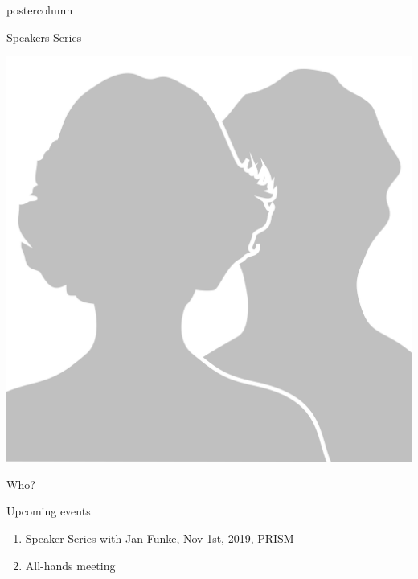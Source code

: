 \documentclass{beamer}
\begin{document}
\begin{frame}
\begin{columns}
\begin{column}{.33\textwidth}
\begin{beamercolorbox}[center,wd=\textwidth]{postercolumn}
\begin{minipage}[T]{.95\textwidth}
{\begin{myblock}{Speakers Series}
\begin{addmargin}[1em]{1em}
\begin{minipage}{0.4\linewidth}
                    \includegraphics[width=\linewidth]{img/placeholder.png}
                    \centerline{Who?}\newline
                \end{minipage}
            \end{addmargin}
          \end{myblock}\vspace{1.25cm}
          \begin{myblock}{Upcoming events}
                        \begin{addmargin}[1em]{1em}
                            \begin{enumerate}
                                \item Speaker Series with Jan Funke, Nov 1st, 2019, PRISM
                                \item All-hands meeting
                            \end{enumerate}
                        \end{addmargin}
                    \end{myblock}
		}\end{minipage}\end{beamercolorbox}
	\end{column}
\end{columns}
\end{frame}
\end{document}
